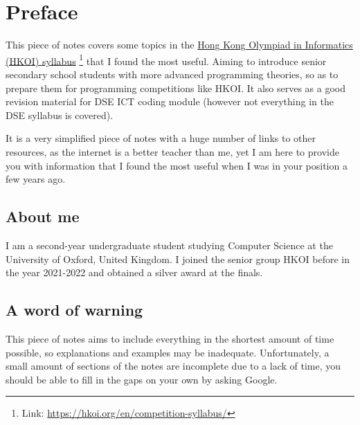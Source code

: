 \chapter*{Preface}

This piece of notes covers some topics in the \href{https://hkoi.org/en/competition-syllabus/}{Hong Kong Olympiad in Informatics (HKOI) syllabus} \footnote{Link: \href{https://hkoi.org/en/competition-syllabus/}{https://hkoi.org/en/competition-syllabus/}} that I found the most useful. Aiming to introduce senior secondary school students with more advanced programming theories, so as to prepare them for programming competitions like HKOI. It also serves as a good revision material for DSE ICT coding module (however not everything in the DSE syllabus is covered).


It is a very simplified piece of notes with a huge number of links to other resources, as the internet is a better teacher than me, yet I am here to provide you with information that I found the most useful when I was in your position a few years ago.

\section*{About me}

I am a second-year undergraduate student studying Computer Science at the University of Oxford, United Kingdom. I joined the senior group HKOI before in the year 2021-2022 and obtained a silver award at the finals. 

\section*{A word of warning}

This piece of notes aims to include everything in the shortest amount of time possible, so explanations and examples may be inadequate. Unfortunately, a small amount of sections of the notes are incomplete due to a lack of time, you should be able to fill in the gaps on your own by asking Google.

